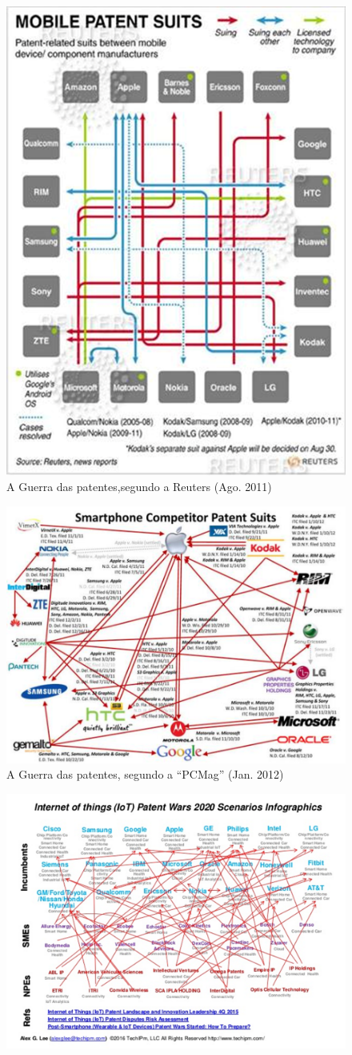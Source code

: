 \documentclass[a4paper,12pt]{article}[abntex2]
\begin{document}
\begin{figure}[H]
    \centering    
    \caption{A Guerra das patentes,segundo a Reuters (Ago. 2011)}
    \includegraphics[width=0.7\linewidth]{Imagens/a8i1.png}
\end{figure}

\begin{figure}
    \centering
    \caption{A Guerra das patentes, segundo a “PCMag” (Jan. 2012)}
    \includegraphics[width=0.7\linewidth]{Imagens/a8i2.png}
\end{figure}

\begin{figure}[H]
    \centering
    \includegraphics[width=0.7\linewidth]{Imagens/a8i3.png}
\end{figure}
\end{document}
